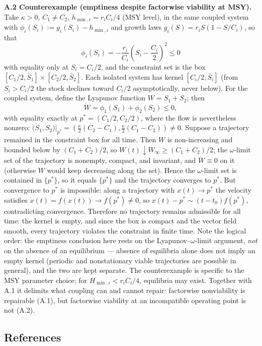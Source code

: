 \documentclass[11pt]{article}
\theoremstyle{definition}
\begin{document}
\textbf{A.2 Counterexample (emptiness despite factorwise viability at
MSY).} Take \(\kappa > 0\), \(C_1 \ne C_2\), \(h_{\min,i} = r_i C_i / 4\) (MSY level), in the same coupled system with \(\phi_i(S_i) := g_i(S_i) - h_{\min,i}\) and growth laws
\(g_i(S) = r_i S (1 - S/C_i)\), so that
\[\phi_i(S_i) = -\frac{r_i}{C_i}\left(S_i - \frac{C_i}{2}\right)^2 \le 0\]
with equality only at \(S_i = C_i/2\), and the constraint set is the box \([C_1/2, \bar S_1] \times [C_2/2, \bar S_2]\). Each isolated system has kernel \([C_i/2, \bar S_i]\) (from \(S_i > C_i/2\) the stock
declines toward \(C_i/2\) asymptotically, never below). For the coupled
system, define the Lyapunov function \(W = S_1 + S_2\); then
\[\dot W = \phi_1(S_1) + \phi_2(S_2) \le 0,\] with equality exactly at
\(p^* = (C_1/2, C_2/2)\), where the flow is nevertheless nonzero:
\(\big(\dot S_1, \dot S_2\big)\big|_{p^*} = \left(\tfrac{\kappa}{2}(C_2 - C_1), \tfrac{\kappa}{2}(C_1 - C_2)\right) \ne 0.\)
Suppose a trajectory remained in the constraint box for all time. Then
\(W\) is non-increasing and bounded below by \((C_1 + C_2)/2\), so
\(W(t) \downarrow W_\infty \ge (C_1 + C_2)/2\); the \(\omega\)-limit set
of the trajectory is nonempty, compact, and invariant, and
\(\dot W \equiv 0\) on it (otherwise \(W\) would keep decreasing along
the set). Hence the \(\omega\)-limit set is contained in \(\{p^*\}\), so
it equals \(\{p^*\}\) and the trajectory converges to \(p^*\). But
convergence to \(p^*\) is impossible: along a trajectory with
\(x(t) \to p^*\) the velocity satisfies
\(\dot x(t) = f(x(t)) \to f(p^*) \ne 0\), so
\(x(t) - p^* \sim (t - t_0) f(p^*)\), contradicting convergence.
Therefore no trajectory remains admissible for all time: the kernel is
empty, and since the box is compact and the vector field smooth, every
trajectory violates the constraint in finite time. Note the logical
order: the emptiness conclusion here rests on the
Lyapunov--\(\omega\)-limit argument, \emph{not} on the absence of an
equilibrium --- absence of equilibria alone does not imply an empty
kernel (periodic and nonstationary viable trajectories are possible in
general), and the two are kept separate. The counterexample is
specific to the MSY parameter choice; for \(H_{\min,i} < r_i C_i / 4\),
equilibria may exist. Together with A.1 it delimits what coupling can
and cannot repair: factorwise nonviability is repairable (A.1), but
factorwise viability at an incompatible operating point is not (A.2).

\subsection{References}\label{references}
\end{document}
